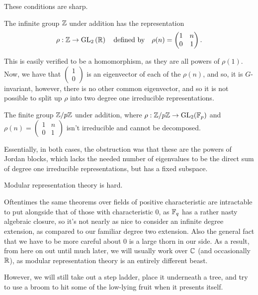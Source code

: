 \documentclass{article}
\begin{document}
These conditions are sharp.
\begin{example}
The infinite group $\mathbb Z$ under addition has the representation $$\rho : \mathbb Z \to \operatorname{GL}_2\left(\mathbb R\right) \quad \textrm{defined by} \quad \rho(n) = \begin{pmatrix} 1 & n \\ 0 & 1 \end{pmatrix}.$$
\end{example}

This is easily verified to be a homomorphism, as they are all powers of $\rho(1)$. Now, we have that $\begin{pmatrix} 1  \\ 0 \end{pmatrix}$ is an eigenvector of each of the $\rho(n)$, and so, it is $G$-invariant, however, there is no other common eigenvector, and so it is not possible to split up $\rho$ into two degree one irreducible representations.

\begin{example}
The finite group $\mathbb Z/p\mathbb Z$ under addition, where $\rho  : \mathbb Z/p\mathbb Z \to \operatorname{GL}_2(\mathbb F_p)$ and $\rho(n) = \begin{pmatrix} 1 & n \\ 0 & 1 \end{pmatrix}$ isn't irreducible and cannot be decomposed.
\end{example}

Essentially, in both cases, the obstruction was that these are the powers of Jordan blocks, which lacks the needed number of eigenvalues to be the direct sum of degree one irreducible representations, but has a fixed subspace.

\begin{note}
Modular representation theory is hard.
\end{note}
Oftentimes the same theorems over fields of positive characteristic are intractable to put alongside that of those with characteristic $0$, as $\mathbb F_q$ has a rather nasty algebraic closure, so it's not nearly as nice to consider an infinite degree extension, as compared to our familiar degree two extension. Also the general fact that we have to be more careful about $0$ is a large thorn in our side. As a result, from here on out until much later, we will usually work over $\mathbb C$ (and occasionally $\mathbb R$), as modular representation theory is an entirely different beast. 

However, we will still take out a step ladder, place it underneath a tree, and try to use a broom to hit some of the low-lying fruit when it presents itself.
\end{document}
